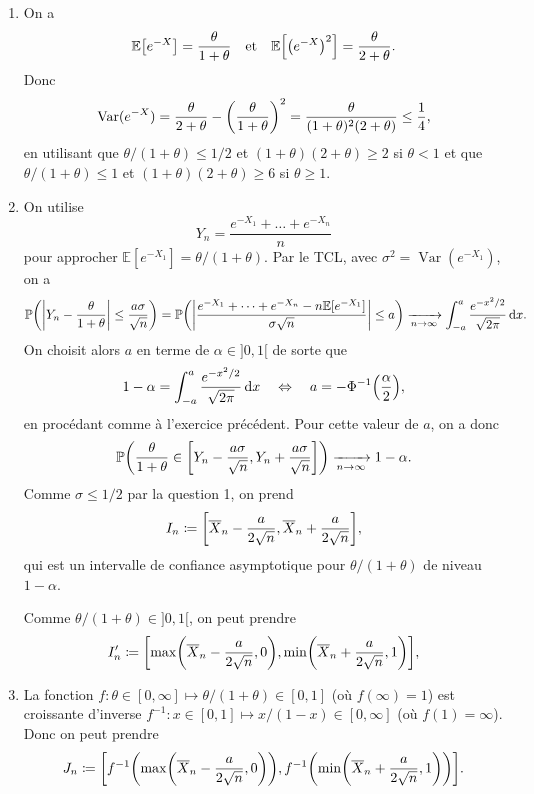 \documentclass[a4paper,11pt]{article}
\let\originalleft\left
\let\originalright\right
\renewcommand{\left}{\mathopen{}\mathclose\bgroup\originalleft}
\renewcommand{\right}{\aftergroup\egroup\originalright}
\newcommand{\E}{\mathbb{E}}
\newcommand{\1}{\mathbbm{1}}
\newcommand{\Ec}[1]{\mathbb{E} \left[#1\right]}
\newcommand{\Pp}[1]{\mathbb{P} \left(#1\right)}
\newcommand{\diff}{\mathop{}\mathopen{}\mathrm{d}}
\DeclareMathOperator{\Var}{Var}
\newcommand{\abs}[1]{\left\lvert#1\right\rvert}
\theoremstyle{plain}
\theoremstyle{definition}
\begin{document}
\begin{enumerate}
	\item On a 
	\[
	\Ec{e^{-X}} = \frac{\theta}{1+\theta} 
	\quad \text{et} \quad
	\Ec{\left( e^{-X} \right)^2} = \frac{\theta}{2+\theta}.
	\] 
	Donc
	\[
	\Var(e^{-X}) = \frac{\theta}{2+\theta} - \left( \frac{\theta}{1+\theta} \right)^2
	= \frac{\theta}{(1+\theta)^2(2+\theta)}
	\leq \frac{1}{4},
	\]
	en utilisant que $\theta/(1+\theta) \leq 1/2$ et $(1+\theta)(2+\theta) \geq 2$ si $\theta < 1$ et que $\theta/(1+\theta) \leq 1$ et $(1+\theta)(2+\theta) \geq 6$ si $\theta \geq 1$.
	\item On utilise 
	\[
	Y_n = \frac{e^{-X_1} + \dots + e^{-X_n}}{n}
	\]
	pour approcher $\E[e^{-X_1}] = \theta/(1+\theta)$.
	Par le TCL, avec $\sigma^2 = \Var(e^{-X_1})$, on a
	\[
	\Pp{\abs{Y_n - \frac{\theta}{1+\theta}} \leq \frac{a \sigma}{\sqrt{n}}}
	= \Pp{ \abs{\frac{e^{-X_1} + \dots + e^{-X_n} - n\E[e^{-X_1}]}{\sigma \sqrt{n}} } \leq a}
	\xrightarrow[n\to\infty]{} 
	\int_{-a}^a \frac{e^{-x^2/2}}{\sqrt{2\pi}} \diff x.
	\]
	On choisit alors $a$ en terme de $\alpha \in {]}0,1{[}$ de sorte que 
	\[
	1- \alpha = \int_{-a}^a \frac{e^{-x^2/2}}{\sqrt{2\pi}} \diff x
	\quad \Leftrightarrow \quad
	a = - \Phi^{-1} \left( \frac{\alpha}{2} \right),
	\]
	en procédant comme à l'exercice précédent.
	Pour cette valeur de $a$, on a donc
	\[
	\Pp{\frac{\theta}{1+\theta} \in 
		\left[ Y_n - \frac{a \sigma}{\sqrt{n}},
		Y_n + \frac{a \sigma}{\sqrt{n}} \right]}
	\xrightarrow[n\to\infty]{} 1-\alpha.
	\]
	Comme $\sigma \leq 1/2$ par la question 1, on prend
	\[
	I_n \coloneqq \left[ \overline{X}_n - \frac{a}{2\sqrt{n}},
	\overline{X}_n + \frac{a}{2\sqrt{n}} \right],
	\]
	qui est un intervalle de confiance asymptotique pour $\theta/(1+\theta)$ de niveau $1-\alpha$.
	
	Comme $\theta/(1+\theta) \in {]}0,1{[}$, on peut prendre 
	\[
	I_n' \coloneqq \left[ \max \left( \overline{X}_n - \frac{a}{2\sqrt{n}},0 \right),
	\min \left( \overline{X}_n + \frac{a}{2\sqrt{n}},1 \right) \right],
	\]
	\item La fonction $f \colon\theta \in [0,\infty] \mapsto \theta/(1+\theta) \in [0,1]$ (où $f(\infty) = 1$) est croissante d'inverse $f^{-1} \colon x \in [0,1] \mapsto x/(1-x)\in [0,\infty]$ (où $f(1) = \infty$).
	Donc on peut prendre
	\[
	J_n \coloneqq \left[ f^{-1} \left( \max \left( \overline{X}_n - \frac{a}{2\sqrt{n}},0 \right) \right),
	f^{-1} \left( \min \left( \overline{X}_n + \frac{a}{2\sqrt{n}},1 \right) \right) \right].
	\]
\end{enumerate}
\end{document}
